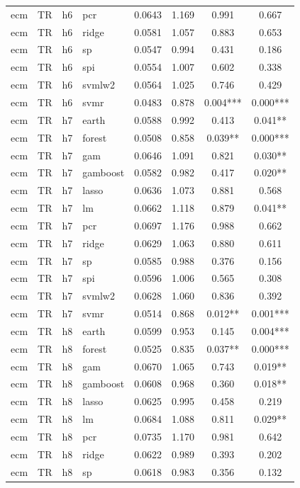 \begin{ThreePartTable}
\begin{longtable}[t]{llclcccc}
ecm & TR & h6 & pcr & 0.0643 & 1.169 & 0.991 & 0.667\\
ecm & TR & h6 & ridge & 0.0581 & 1.057 & 0.883 & 0.653\\
ecm & TR & h6 & sp & 0.0547 & 0.994 & 0.431 & 0.186\\
ecm & TR & h6 & spi & 0.0554 & 1.007 & 0.602 & 0.338\\
ecm & TR & h6 & svmlw2 & 0.0564 & 1.025 & 0.746 & 0.429\\
ecm & TR & h6 & svmr & 0.0483 & 0.878 & 0.004*** & 0.000***\\
\addlinespace
ecm & TR & h7 & earth & 0.0588 & 0.992 & 0.413 & 0.041**\\
ecm & TR & h7 & forest & 0.0508 & 0.858 & 0.039** & 0.000***\\
ecm & TR & h7 & gam & 0.0646 & 1.091 & 0.821 & 0.030**\\
ecm & TR & h7 & gamboost & 0.0582 & 0.982 & 0.417 & 0.020**\\
ecm & TR & h7 & lasso & 0.0636 & 1.073 & 0.881 & 0.568\\
ecm & TR & h7 & lm & 0.0662 & 1.118 & 0.879 & 0.041**\\
ecm & TR & h7 & pcr & 0.0697 & 1.176 & 0.988 & 0.662\\
ecm & TR & h7 & ridge & 0.0629 & 1.063 & 0.880 & 0.611\\
ecm & TR & h7 & sp & 0.0585 & 0.988 & 0.376 & 0.156\\
ecm & TR & h7 & spi & 0.0596 & 1.006 & 0.565 & 0.308\\
ecm & TR & h7 & svmlw2 & 0.0628 & 1.060 & 0.836 & 0.392\\
ecm & TR & h7 & svmr & 0.0514 & 0.868 & 0.012** & 0.001***\\
\addlinespace
ecm & TR & h8 & earth & 0.0599 & 0.953 & 0.145 & 0.004***\\
ecm & TR & h8 & forest & 0.0525 & 0.835 & 0.037** & 0.000***\\
ecm & TR & h8 & gam & 0.0670 & 1.065 & 0.743 & 0.019**\\
ecm & TR & h8 & gamboost & 0.0608 & 0.968 & 0.360 & 0.018**\\
ecm & TR & h8 & lasso & 0.0625 & 0.995 & 0.458 & 0.219\\
ecm & TR & h8 & lm & 0.0684 & 1.088 & 0.811 & 0.029**\\
ecm & TR & h8 & pcr & 0.0735 & 1.170 & 0.981 & 0.642\\
ecm & TR & h8 & ridge & 0.0622 & 0.989 & 0.393 & 0.202\\
ecm & TR & h8 & sp & 0.0618 & 0.983 & 0.356 & 0.132\\

\end{longtable}
\end{ThreePartTable}
